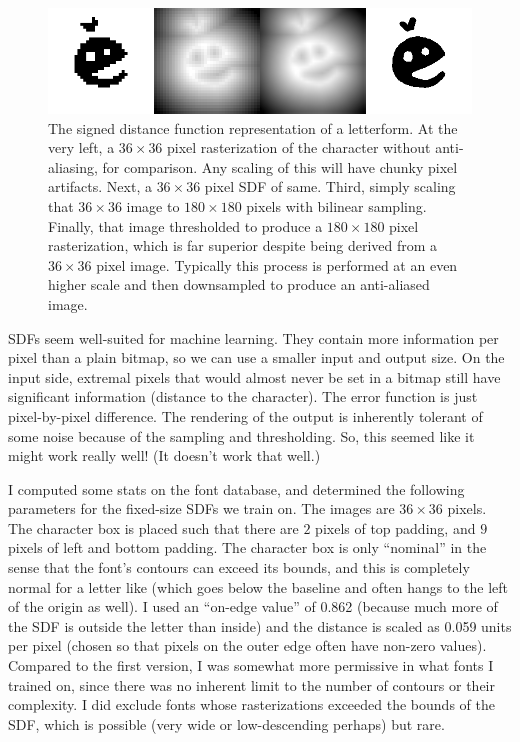 \documentclass[twocolumn]{article}
\begin{document}
\begin{figure}[ht]
\centering
  \includegraphics[width=0.95 \linewidth]{sdf-figure}
\caption{
  The signed distance function representation of a letterform.
  At the very left, a $36\times 36$ pixel rasterization of
  the character without anti-aliasing, for comparison. Any
  scaling of this will have chunky pixel artifacts. Next,
  a $36\times 36$ pixel SDF of same. Third, simply scaling
  that $36\times 36$ image to $180 \times 180$ pixels with
  bilinear sampling. Finally, that image thresholded to
  produce a $180 \times 180$ pixel rasterization, which is
  far superior despite being derived from a $36 \times 36$ pixel
  image. Typically this process is performed at an even higher
  scale and then downsampled to produce an anti-aliased image.
} \label{fig:sdf}
\end{figure}

SDFs seem well-suited for machine learning. They contain more
information per pixel than a plain bitmap, so we can use a smaller
input and output size. On the input side, extremal pixels that would
almost never be set in a bitmap still have significant information
(distance to the character). The error function is just pixel-by-pixel
difference. The rendering of the output is inherently tolerant of some
noise because of the sampling and thresholding. So, this seemed like
it might work really well! (It doesn't work that well.)

I computed some stats on the font database, and determined the
following parameters for the fixed-size SDFs we train on. The images
are $36 \times 36$ pixels. The character box is placed such that there
are $2$ pixels of top padding, and $9$ pixels of left and bottom
padding. The character box is only ``nominal'' in the sense that the
font's contours can exceed its bounds, and this is completely normal
for a letter like  (which goes below the baseline and
often hangs to the left of the origin as well). I used an ``on-edge
value'' of 0.862 (because much more of the SDF is outside the letter
than inside) and the distance is scaled as 0.059 units per pixel
(chosen so that pixels on the outer edge often have non-zero values).
Compared to the first version, I was somewhat more permissive in what
fonts I trained on, since there was no inherent limit to the number of
contours or their complexity. I did exclude fonts whose rasterizations
exceeded the bounds of the SDF, which is possible (very wide
 or low-descending  perhaps) but rare.
\end{document}
